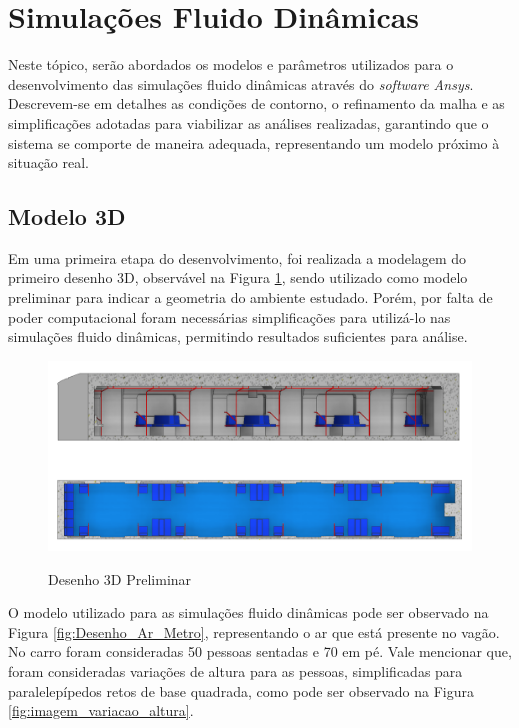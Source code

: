 \documentclass[acronym,symbols,table]{fei}
\begin{document}
    
\section{Simulações Fluido Dinâmicas}

Neste tópico, serão abordados os modelos e parâmetros utilizados para o desenvolvimento das simulações fluido dinâmicas através do \textit{software Ansys}. Descrevem-se em detalhes as condições de contorno, o refinamento da malha e as simplificações adotadas para viabilizar as análises realizadas, garantindo que o sistema se comporte de maneira adequada, representando um modelo próximo à situação real.

\subsection{Modelo 3D}

Em uma primeira etapa do desenvolvimento, foi realizada a modelagem do primeiro desenho 3D, observável na Figura \ref{fig:Desenho_Metro}, sendo utilizado como modelo preliminar para indicar a geometria do ambiente estudado. Porém, por falta de poder computacional foram necessárias simplificações para utilizá-lo nas simulações fluido dinâmicas, permitindo resultados suficientes para análise.

\begin{figure}[!htb]
    \centering
    \caption{Desenho 3D Preliminar}
    \includegraphics[width=1\linewidth]{Imagens/Desenho_Metro.png}
    \label{fig:Desenho_Metro}
\end{figure}

O modelo utilizado para as simulações fluido dinâmicas pode ser observado na Figura \ref{fig:Desenho_Ar_Metro}, representando o ar que está presente no vagão. No carro foram consideradas 50 pessoas sentadas e 70 em pé. Vale mencionar que, foram consideradas variações de altura para as pessoas, simplificadas para paralelepípedos retos de base quadrada, como pode ser observado na Figura \ref{fig:imagem_variacao_altura}.
\end{document}
